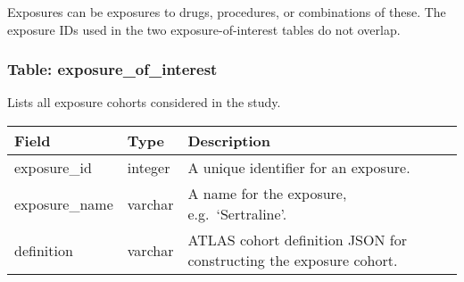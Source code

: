 \documentclass[
]{article}
\begin{document}
Exposures can be exposures to drugs, procedures, or combinations of
these. The exposure IDs used in the two exposure-of-interest tables do
not overlap.

\hypertarget{table-exposure_of_interest}{%
\subsubsection{Table:
exposure\_of\_interest}\label{table-exposure_of_interest}}

Lists all exposure cohorts considered in the study.

\begin{longtable}[]{@{}lll@{}}
\toprule
\begin{minipage}[b]{0.23\columnwidth}\raggedright
Field\strut
\end{minipage} & \begin{minipage}[b]{0.18\columnwidth}\raggedright
Type\strut
\end{minipage} & \begin{minipage}[b]{0.50\columnwidth}\raggedright
Description\strut
\end{minipage}\tabularnewline
\midrule
\endhead
\begin{minipage}[t]{0.23\columnwidth}\raggedright
exposure\_id\strut
\end{minipage} & \begin{minipage}[t]{0.18\columnwidth}\raggedright
integer\strut
\end{minipage} & \begin{minipage}[t]{0.50\columnwidth}\raggedright
A unique identifier for an exposure.\strut
\end{minipage}\tabularnewline
\begin{minipage}[t]{0.23\columnwidth}\raggedright
exposure\_name\strut
\end{minipage} & \begin{minipage}[t]{0.18\columnwidth}\raggedright
varchar\strut
\end{minipage} & \begin{minipage}[t]{0.50\columnwidth}\raggedright
A name for the exposure, e.g.~`Sertraline'.\strut
\end{minipage}\tabularnewline
\begin{minipage}[t]{0.23\columnwidth}\raggedright
definition\strut
\end{minipage} & \begin{minipage}[t]{0.18\columnwidth}\raggedright
varchar\strut
\end{minipage} & \begin{minipage}[t]{0.50\columnwidth}\raggedright
ATLAS cohort definition JSON for constructing the exposure cohort.\strut
\end{minipage}\tabularnewline
\bottomrule
\end{longtable}
\end{document}
